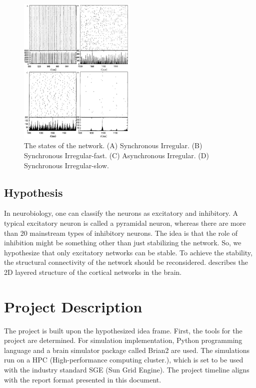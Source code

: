\documentclass[a4paper,12pt]{article}
\begin{document}
\begin{figure}[H]
    \centering
    \includegraphics[width = 0.5\textwidth]{brunel.png}
    \caption{The states of the network. (A) Synchronous Irregular. (B) Synchronous Irregular-fast. (C) Asynchronous Irregular. (D) Synchronous Irregular-slow.}
    \label{brunel_fig}
\end{figure} 

\subsection{Hypothesis}

In neurobiology, one can classify the neurons as excitatory and inhibitory. A typical excitatory neuron is called a pyramidal neuron, whereas there are more than 20 mainstream types of inhibitory neurons. The idea is that the role of inhibition might be something other than just stabilizing the network. So, we hypothesize that only excitatory networks can be stable. To achieve the stability, the structural connectivity of the network should be reconsidered. \cite{2Dstructure} describes the 2D layered structure of the cortical networks in the brain. 

\section{Project Description}
The project is built upon the hypothesized idea frame. First, the tools for the project are determined. For simulation implementation, Python programming language and a brain simulator package called Brian2 \cite{brian2} are used. The simulations run on a HPC (High-performance computing cluster.), which is set to be used with the industry standard SGE (Sun Grid Engine). The project timeline aligns with the report format presented in this document. 
\end{document}
